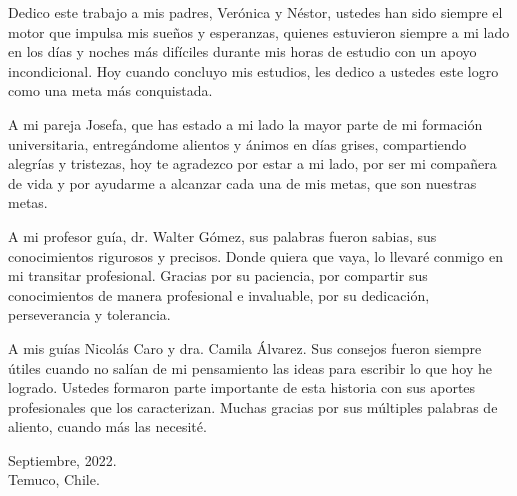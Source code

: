 


Dedico este trabajo a mis padres, Verónica y Néstor, ustedes han sido siempre el motor que impulsa mis sueños y esperanzas, 
quienes estuvieron siempre a mi lado en los días y noches más difíciles durante mis horas de estudio con un apoyo incondicional. 
Hoy cuando concluyo mis estudios, les dedico a ustedes este logro como una meta más conquistada. 

A mi pareja Josefa, que has estado a mi lado la mayor parte de mi formación universitaria, entregándome alientos y ánimos en días grises, compartiendo alegrías y tristezas,
hoy te agradezco por estar a mi lado, por ser mi compañera de vida y por ayudarme a alcanzar cada una de mis metas, que son nuestras metas.

A mi profesor guía, dr. Walter Gómez, sus palabras fueron sabias, sus conocimientos rigurosos y precisos. Donde quiera que vaya, 
lo llevaré conmigo en mi transitar profesional. Gracias por su paciencia, por compartir sus conocimientos de manera profesional e invaluable, por su dedicación, perseverancia y tolerancia.

A mis guías Nicolás Caro y dra. Camila Álvarez. Sus consejos fueron siempre 
útiles cuando no salían de mi pensamiento las ideas para escribir lo que hoy he logrado. Ustedes formaron parte importante de esta historia con sus aportes profesionales que 
los caracterizan. Muchas gracias por sus múltiples palabras de aliento, cuando más las necesité. 

\vfill
\singlespacing
\begin{flushright}
	\noindent
    Septiembre, 2022. \\
	Temuco, Chile. 
\end{flushright}
    
